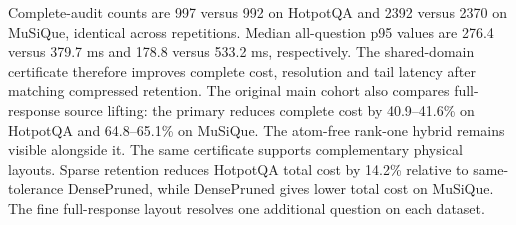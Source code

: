 Complete-audit counts are 997 versus 992 on HotpotQA and 2392 versus 2370 on MuSiQue, identical across repetitions. Median all-question p95 values are 276.4 versus 379.7 ms and 178.8 versus 533.2 ms, respectively. The shared-domain certificate therefore improves complete cost, resolution and tail latency after matching compressed retention.
The original main cohort also compares full-response source lifting: the primary reduces complete cost by 40.9--41.6\% on HotpotQA and 64.8--65.1\% on MuSiQue. The atom-free rank-one hybrid remains visible alongside it.
The same certificate supports complementary physical layouts. Sparse retention reduces HotpotQA total cost by 14.2\% relative to same-tolerance DensePruned, while DensePruned gives lower total cost on MuSiQue. The fine full-response layout resolves one additional question on each dataset.

